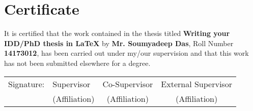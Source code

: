 \chapter*{\vspace{-3cm} \centering \Large Certificate}

It is certified that the work contained in the thesis titled \textbf{Writing your IDD/PhD thesis in \texorpdfstring{\LaTeX}{LaTeX}} by \textbf{Mr. Soumyadeep Das}, Roll Number \textbf{14173012}, has been carried out under my/our supervision and that this work has not been submitted elsewhere for a degree. \\





\vspace*{3cm}
\begin{table}[htbp]
	{ \bfseries
	\begin{tabular}{llcc}
		Signature: \hspace{0.5cm} & Supervisor            \hspace{1cm}        & Co-Supervisor   \hspace{1cm}  &  External Supervisor   \\
		 \hspace{0.5cm}  & (Affiliation)             \hspace{1cm}       &  (Affiliation)        \hspace{1cm}       &  (Affiliation)     
	\end{tabular} 
}
\end{table}

